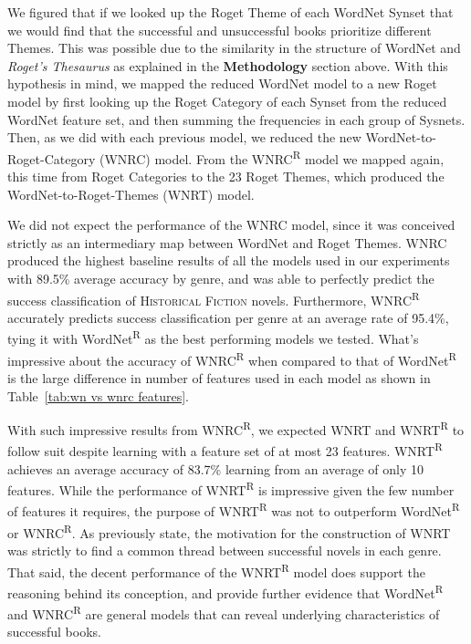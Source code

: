 We figured that if we looked up the Roget Theme of each WordNet Synset that we would find that the successful and unsuccessful books prioritize different Themes.
This was possible due to the similarity in the structure of WordNet and \textit{Roget's Thesaurus} as explained in the \textbf{Methodology} section above.
With this hypothesis in mind, we mapped the reduced WordNet model to a new Roget model by first looking up the Roget Category of each Synset from the reduced WordNet feature set, and then summing the frequencies in each group of Sysnets.
Then, as we did with each previous model, we reduced the new WordNet-to-Roget-Category (WNRC) model.
From the WNRC\textsuperscript{R} model we mapped again, this time from Roget Categories to the 23 Roget Themes, which produced the WordNet-to-Roget-Themes (WNRT) model.

We did not expect the performance of the WNRC model, since it was conceived strictly as an intermediary map between WordNet and Roget Themes. 
WNRC produced the highest baseline results of all the models used in our experiments with 89.5\% average accuracy by genre, and was able to perfectly predict the success classification of \textsc{Historical Fiction} novels.
Furthermore, WNRC\textsuperscript{R} accurately predicts success classification per genre at an average rate of 95.4\%, tying it with WordNet\textsuperscript{R} as the best performing models we tested.
What's impressive about the accuracy of WNRC\textsuperscript{R} when compared to that of WordNet\textsuperscript{R} is the large difference in number of features used in each model as shown in Table~\ref{tab:wn vs wnrc features}.



With such impressive results from WNRC\textsuperscript{R}, we expected WNRT and WNRT\textsuperscript{R} to follow suit despite learning with a feature set of at most 23 features.
WNRT\textsuperscript{R} achieves an average accuracy of 83.7\% learning from an average of only 10 features. 
While the performance of WNRT\textsuperscript{R} is impressive given the few number of features it requires, the purpose of WNRT\textsuperscript{R} was not to outperform WordNet\textsuperscript{R} or WNRC\textsuperscript{R}.
As previously state, the motivation for the construction of WNRT was strictly to find a common thread between successful novels in each genre.
That said, the decent performance of the WNRT\textsuperscript{R} model does support the reasoning behind its conception, and provide further evidence that WordNet\textsuperscript{R} and WNRC\textsuperscript{R} are general models that can reveal underlying characteristics of successful books.

